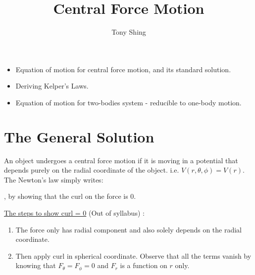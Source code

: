 \documentclass[class=article, crop=false, 12pt]{standalone}
\author{Tony Shing}
\title{Central Force Motion}
\begin{document}
\maketitle


\begin{overview}
    \begin{itemize}
        \item Equation of motion for central force motion, and its standard solution.
        \item Deriving Kelper's Laws. 
        \item Equation of motion for two-bodies system - reducible to one-body motion.
    \end{itemize}
\end{overview}


\section{The General Solution}

An object undergoes a central force motion if it is moving in a potential that depends purely on the radial coordinate of the object. 
i.e. $V(r,\theta, \phi) = V(r)$. The Newton's  law simply writes:


, 
by showing that the curl on the force is $0$.

\begin{notation}[]
    \ul{The steps to show curl = 0} (Out of syllabus) :

    \begin{enumerate}
        \item The force only has radial component and also solely depends on the radial coordinate.
        \item Then apply curl in spherical coordinate. 
        Observe that all the terms vanish by knowing that 
        $F_\theta = F_\phi = 0$ and $F_r$ is a function on $r$ only.
    \end{enumerate} 
\end{notation}
\end{document}
